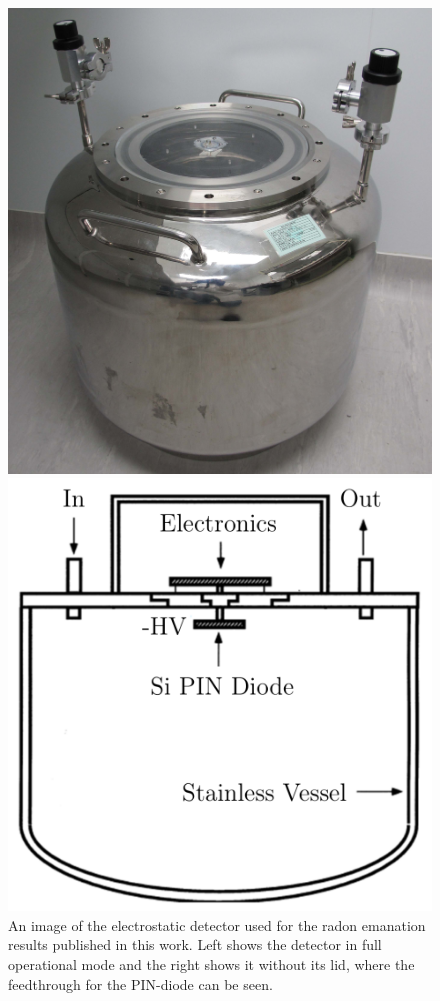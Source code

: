 \begin{figure}[h!]
    \includegraphics[scale=0.3]{Chapter_4/Figures/electrostatic_detector_2.png}
    \caption[An image of the electrostatic detector used for the radon emanation results published in this work. Left shows the detector in full operational mode and the right shows it without its lid, where the feedthrough for the PIN-diode can be seen.]
    {An image of the electrostatic detector used for the radon emanation results published in this work. Left shows the detector in full operational mode and the right shows it without its lid, where the feedthrough for the PIN-diode can be seen.}
    \label{fig:elecrostatic_detector}
    \vspace{2cm}
    \includegraphics[scale=0.5]{Chapter_4/Figures/electrostatic_detector_schematic.png}

\end{figure}
